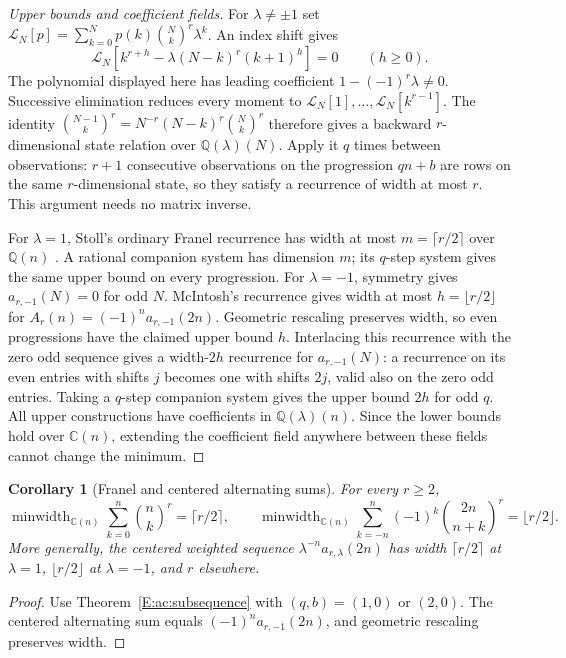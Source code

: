 \documentclass[11pt,a4paper]{article}
\newtheorem{corollary}[theorem]{Corollary}
\theoremstyle{definition}
\theoremstyle{remark}
\numberwithin{equation}{section}
\begin{document}
\begin{proof}[Upper bounds and coefficient fields]
For $\lambda\ne\pm1$ set
$\mathcal L_N[p]=\sum_{k=0}^Np(k)\binom Nk^r\lambda^k$.
An index shift gives
\[
 \mathcal L_N[k^{r+h}-\lambda(N-k)^r(k+1)^h]=0
 \qquad(h\ge0).
\]
The polynomial displayed here has leading coefficient
$1-(-1)^r\lambda\ne0$. Successive elimination reduces every moment
to $\mathcal L_N[1],\ldots,\mathcal L_N[k^{r-1}]$.
The identity
$\binom{N-1}{k}^r=N^{-r}(N-k)^r\binom Nk^r$
therefore gives a backward $r$-dimensional state relation over
$\mathbb Q(\lambda)(N)$. Apply it $q$ times between observations:
$r+1$ consecutive observations on the progression $qn+b$ are rows
on the same $r$-dimensional state, so they satisfy a recurrence of
width at most $r$. This argument needs no matrix inverse.

For $\lambda=1$, Stoll's ordinary Franel recurrence has width at
most $m=\lceil r/2\rceil$ over $\mathbb Q(n)$
\cite{AC_Stoll}. A rational companion system has dimension $m$;
its $q$-step system gives the same upper bound on every progression.
For $\lambda=-1$, symmetry gives $a_{r,-1}(N)=0$ for odd $N$.
McIntosh's recurrence \cite[Theorem 1]{AC_McIntosh} gives width
at most $h=\lfloor r/2\rfloor$ for
$A_r(n)=(-1)^n a_{r,-1}(2n)$. Geometric rescaling preserves width,
so even progressions have the claimed upper bound $h$. Interlacing
this recurrence with the zero odd sequence gives a width-$2h$
recurrence for $a_{r,-1}(N)$: a recurrence on its even entries with
shifts $j$ becomes one with shifts $2j$, valid also on the zero
odd entries. Taking a $q$-step companion system gives the upper
bound $2h$ for odd $q$. All upper constructions have coefficients
in $\mathbb Q(\lambda)(n)$. Since the lower bounds hold over
$\mathbb C(n)$, extending the coefficient field anywhere between
these fields cannot change the minimum.
\end{proof}

\begin{corollary}[Franel and centered alternating sums]
\label{E:ac:oldEF}
For every $r\ge2$,
\[
 \operatorname{minwidth}_{\mathbb C(n)}
       \sum_{k=0}^n\binom nk^r=\lceil r/2\rceil,
 \qquad
 \operatorname{minwidth}_{\mathbb C(n)}
       \sum_{k=-n}^n(-1)^k\binom{2n}{n+k}^r=\lfloor r/2\rfloor.
\]
More generally, the centered weighted sequence
$\lambda^{-n}a_{r,\lambda}(2n)$ has width
$\lceil r/2\rceil$ at $\lambda=1$, $\lfloor r/2\rfloor$ at
$\lambda=-1$, and $r$ elsewhere.
\end{corollary}
\begin{proof}
Use Theorem~\ref{E:ac:subsequence} with $(q,b)=(1,0)$ or $(2,0)$.
The centered alternating sum equals $(-1)^na_{r,-1}(2n)$, and
geometric rescaling preserves width.
\end{proof}
\end{document}
